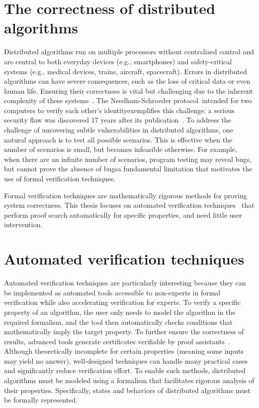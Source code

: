 
\section{The correctness of distributed algorithms}
Distributed algorithms run on multiple processors without centralized control and are central to both everyday devices (e.g., smartphones) and safety-critical systems (e.g., medical devices, trains, aircraft, spacecraft).
Errors in distributed algorithms can have severe consequences, such as the loss of critical data or even human life. Ensuring their correctness is vital but challenging due to the inherent complexity of these systems~\cite{heiser2010theroad, lamport2019thebyzantine}. 
The Needham-Schroeder protocol~\cite{needham1978using}\textemdash intended for two computers to verify each other's identity\textemdash exemplifies this challenge: a serious security flaw was discovered 17 years after its publication~\cite{lowe1996breaking}.
To address the challenge of uncovering subtle vulnerabilities in distributed algorithms, one natural approach is to test all possible scenarios. This is effective when the number of scenarios is small, but becomes infeasible otherwise. For example, when there are an infinite number of scenarios, program testing may reveal bugs, but cannot prove the absence of bugs\textemdash a fundamental limitation that motivates the use of formal verification techniques.

Formal verification techniques are mathematically rigorous methods for proving system correctness. 
This thesis focuses on automated verification techniques~\cite{clarke2018model, contejean2011automated, cortier2014formal, urbain2004modular,steinbach1995simplification,kassing2024dependency,marche2004modular} that perform proof search automatically for specific properties, and need little user intervention.
   
\section{Automated verification techniques}
Automated verification techniques are particularly interesting because they can be implemented as automated tools accessible to non-experts in formal verification while also accelerating verification for experts.
To verify a specific property of an algorithm, the user only needs to model the algorithm in the required formalism, and the tool then automatically checks conditions that mathematically imply the target property. To further ensure the correctness of results, advanced tools generate certificates verifiable by proof assistants~\cite{contejean2011automated}. 
Although theoretically incomplete for certain properties (meaning some inputs may yield no answer), well-designed techniques can handle many practical cases and significantly reduce verification effort. 
To enable such methods, distributed algorithms must be modeled using a formalism that facilitates rigorous analysis of their properties. Specifically, states and behaviors of distributed algorithms must be formally represented.

